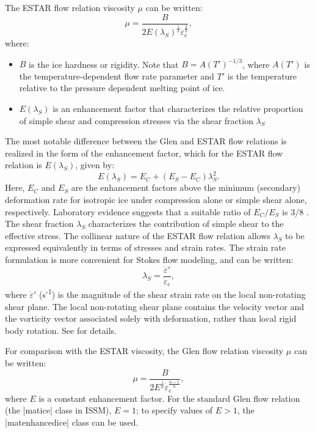 The ESTAR flow relation viscosity $\mu$ can be written:
\begin{equation}
	\mu = \frac{B}{2 E(\lambda_S)^{\frac{1}{3}}\dot{\varepsilon}_e^{\frac{2}{3}}},\label{eq:estar}
\end{equation}
where:
\begin{itemize}
	\item $B$ is the ice hardness or rigidity. Note that $B=A(T')^{-1/3}$, where $A(T')$ is the temperature-dependent flow rate parameter and $T'$ is the temperature relative to the pressure dependent melting point of ice.
	\item $E(\lambda_S)$ is an enhancement factor that characterizes the relative proportion of simple shear and compression stresses via the shear fraction $\lambda_S$
\end{itemize}

The most notable difference between the Glen and ESTAR flow relations is realized in the form of the enhancement factor, which for the ESTAR flow relation is $E(\lambda_S)$, given by:
\begin{equation}
	E(\lambda_S) = E_C + (E_S - E_C) \lambda_S^2.
\end{equation}
Here, $E_C$ and $E_S$ are the enhancement factors above the minimum (secondary) deformation rate for isotropic ice under compression alone or simple shear alone, respectively. Laboratory evidence suggests that a suitable ratio of $E_C/E_S$ is $3/8$ \citep{Treverrow2012}. The shear fraction $\lambda_S$ characterizes the contribution of simple shear to the effective stress. The collinear nature of the ESTAR flow relation allows $\lambda_S$ to be expressed equivalently in terms of stresses and strain rates. The strain rate formulation is more convenient for Stokes flow modeling, and can be written:
\begin{equation}
	\lambda_S=\frac{\dot{\varepsilon}'}{\dot{\varepsilon}_e},
\end{equation}
where $\dot{\varepsilon}'$ (s\textsuperscript{-1}) is the magnitude of the shear strain rate on the local non-rotating shear plane. The local non-rotating shear plane contains the velocity vector and the vorticity vector associated solely with deformation, rather than local rigid body rotation. See \cite{Graham2018} for details. 

For comparison with the ESTAR viscosity, the Glen flow relation viscosity $\mu$ can be written:
\begin{equation}
	\mu = \frac{B}{2 E^{\frac{1}{n}}\dot{\varepsilon}_e^{\frac{n-1}{n}}},\label{eq:glen}
\end{equation}
where $E$ is a constant enhancement factor. For the standard Glen flow relation (the \lstinlinebg|matice| class in ISSM), $E=1$; to specify values of $E>1$, the \lstinlinebg|matenhancedice| class can be used.

